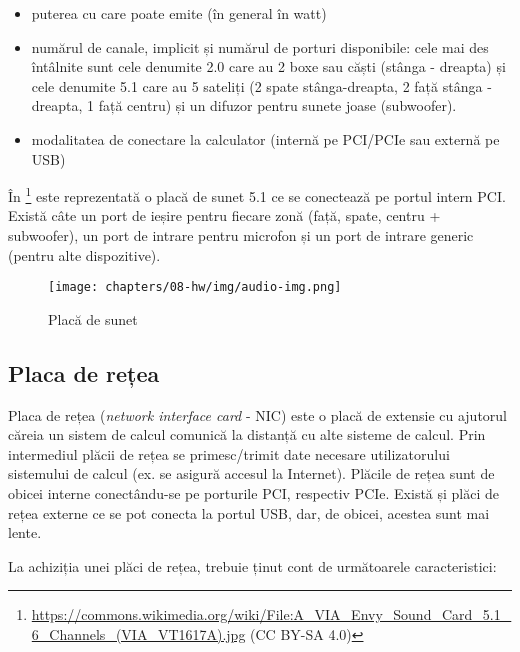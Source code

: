 \begin{itemize}
  \item puterea cu care poate emite (în general în watt)
  \item numărul de canale, implicit și numărul de porturi disponibile: cele mai des întâlnite sunt cele denumite 2.0 care au 2 boxe sau căști (stânga - dreapta) și cele denumite 5.1 care au 5 sateliți (2 spate stânga-dreapta, 2 față stânga - dreapta, 1 față centru) și un difuzor pentru sunete joase (subwoofer).
  \item modalitatea de conectare la calculator (internă pe PCI/PCIe sau externă pe USB)
\end{itemize}

În \footnote{\url{https://commons.wikimedia.org/wiki/File:A_VIA_Envy_Sound_Card_5.1_6_Channels_(VIA_VT1617A).jpg} (CC BY-SA 4.0)} este reprezentată o placă de sunet 5.1 ce se conectează pe portul intern PCI.
Există câte un port de ieșire pentru fiecare zonă (față, spate, centru + subwoofer), un port de intrare pentru microfon și un
port de intrare generic (pentru alte dispozitive).

\begin{figure}[!htbp]
  \centering
  \texttt{[image: chapters/08-hw/img/audio-img.png]}
  \caption{Placă de sunet}
  \label{fig:hw:audio}
\end{figure}

\subsection{Placa de rețea}
\label{sec:hw:extension:nic}

Placa de rețea (\textit{network interface card} - NIC) este o placă de extensie cu ajutorul căreia un sistem de calcul comunică la distanță cu alte sisteme de calcul.
Prin intermediul plăcii de rețea se primesc/trimit date necesare utilizatorului sistemului de calcul (ex. se asigură accesul la Internet).
Plăcile de rețea sunt de obicei interne conectându-se pe porturile PCI, respectiv PCIe.
Există și plăci de rețea externe ce se pot conecta la portul USB, dar, de obicei, acestea sunt mai lente.

La achiziția unei plăci de rețea, trebuie ținut cont de următoarele caracteristici:

